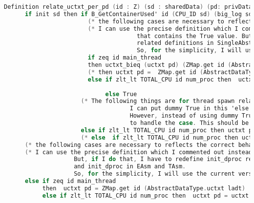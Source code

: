 \begin{lstlisting}[language=C]
    Definition relate_uctxt_per_pd (id : Z) (sd : sharedData) (pd: privData) (ladt : AbstractDataType.RData) :=
      if init sd then if B_GetContainerUsed' id (CPU_ID sd) (big_log sd) then 
                        (* the following cases are necessary to reflects the correct behaviour of the initialization *)
                        (* I can use the precise definition which I commented out instead of the version 
                                      that contains the True value. But, if I do that, I have to redefine init_dproc
                                      related definitions in SingleAbstractDataType and init_dproc in EAsm and TAsm.
                                      So, for the simplicity, I will use the current version *)
                        if zeq id main_thread 
                        then uctxt_bieq (uctxt pd) (ZMap.get id (AbstractDataType.uctxt ladt))
                        (* then uctxt pd =  ZMap.get id (AbstractDataType.uctxt ladt) *)
                        else if zlt_lt TOTAL_CPU id num_proc then  uctxt_bieq (uctxt pd) 
                                                                              (ZMap.get id (AbstractDataType.uctxt ladt))
                             else True
                      (* The following things are for thread spawn related_RData.
                                    I can put dummy True in this 'else' case, and prove the case for thread_spawn. 
                                    However, instead of using dummy True, I decided to add the precise value 
                                    to handle the case. This should be much better then the dummy True *)
                      else if zlt_lt TOTAL_CPU id num_proc then uctxt pd = uctxt (thread_init_dproc id) else True
                      (* else  if zlt_lt TOTAL_CPU id num_proc then uctxt pd = uctxt (thread_init_dproc id) else True *)
      (* the following cases are necessary to reflects the correct behaviour of the initialization *)
      (* I can use the precise definition which I commented out instead of the version that contains the True value.
                    But, if I do that, I have to redefine init_dproc related definitions in SingleAbstractDataType 
                    and init_dproc in EAsm and TAsm.
                    So, for the simplicity, I will use the current version *)
      else if zeq id main_thread 
           then  uctxt pd = ZMap.get id (AbstractDataType.uctxt ladt)
           else if zlt_lt TOTAL_CPU id num_proc then  uctxt pd = uctxt (thread_init_dproc id) else True.


\end{lstlisting}
